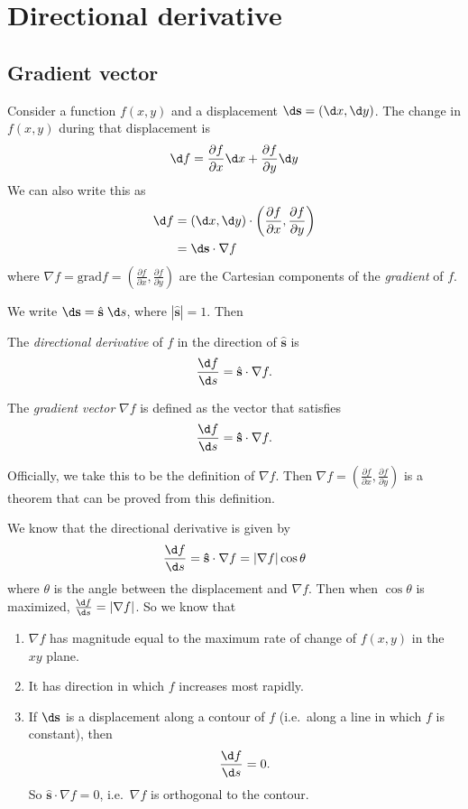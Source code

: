 \documentclass[a4paper]{article}
\begin{document}
\section{Directional derivative}
\label{sec:directional-derivative}
\subsection{Gradient vector}
Consider a function $f(x, y)$ and a displacement $\d\mathbf{s} = (\d x, \d y)$. The change in $f(x, y)$ during that displacement is
\[
  \d f = \frac{\partial f}{\partial x}\d x + \frac{\partial f}{\partial y}\d y
\]
We can also write this as
\begin{align*}
  \d f &= (\d x, \d y)\cdot \left(\frac{\partial f}{\partial x}, \frac{\partial f}{\partial y}\right)\\
  &= \d\mathbf{s}\cdot \nabla f
\end{align*}
where $\nabla f = \mathrm{grad}f = \left(\frac{\partial f}{\partial x}, \frac{\partial f}{\partial y}\right)$ are the Cartesian components of the \emph{gradient} of $f$.

We write $\d\mathbf{s} = \hat{\mathbf{s}}\;\d s$, where $|\hat{\mathbf{s}}| = 1$. Then
\begin{defi}
  The \emph{directional derivative} of $f$ in the direction of $\hat{\mathbf{s}}$ is
  \[
    \frac{\d f}{\d s} = \hat{\mathbf{s}}\cdot \nabla f.
  \]
\end{defi}

\begin{defi}
  The \emph{gradient vector} $\nabla f$ is defined as the vector that satisfies
  \[
    \frac{\d f}{\d s} = \mathbf{\hat{s}}\cdot \nabla f.
  \]
\end{defi}
Officially, we take this to be the definition of $\nabla f$. Then $\nabla f = \left(\frac{\partial f}{\partial x}, \frac{\partial f}{\partial y}\right)$ is a theorem that can be proved from this definition.

We know that the directional derivative is given by
\[
  \frac{\d f}{\d s} = \mathbf{\hat{s}}\cdot \nabla f = |\nabla f| \cos \theta
\]
where $\theta$ is the angle between the displacement and $\nabla f$. Then when $\cos\theta$ is maximized, $\frac{\d f}{\d s} = |\nabla f|$. So we know that
\begin{enumerate}
  \item $\nabla f$ has magnitude equal to the maximum rate of change of $f(x, y)$ in the $xy$ plane.
  \item It has direction in which $f$ increases most rapidly.
  \item If $\d\mathbf{s}$ is a displacement along a contour of $f$ (i.e.\ along a line in which $f$ is constant), then
    \[
      \frac{\d f}{\d s} = 0.
    \]
    So $\mathbf{\hat{s}}\cdot \nabla f = 0$, i.e.\ $\nabla f$ is orthogonal to the contour.
\end{enumerate}
\end{document}
